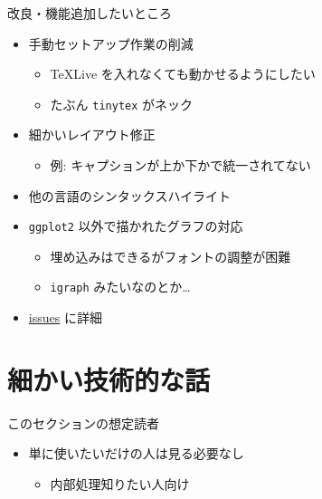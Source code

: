 \documentclass[
  12pt,
  ignorenonframetext,
]{beamer}
\providecommand{\tightlist}{%
  \setlength{\itemsep}{0pt}\setlength{\parskip}{0pt}}
\begin{document}
\begin{frame}[fragile]{改良・機能追加したいところ}
\protect\hypertarget{ux6539ux826fux6a5fux80fdux8ffdux52a0ux3057ux305fux3044ux3068ux3053ux308d}{}

\begin{itemize}
\tightlist
\item
  手動セットアップ作業の削減

  \begin{itemize}
  \tightlist
  \item
    TeXLive を入れなくても動かせるようにしたい
  \item
    たぶん \texttt{tinytex} がネック
  \end{itemize}
\item
  細かいレイアウト修正

  \begin{itemize}
  \tightlist
  \item
    例: キャプションが上か下かで統一されてない
  \end{itemize}
\item
  他の言語のシンタックスハイライト
\item
  \texttt{ggplot2} 以外で描かれたグラフの対応

  \begin{itemize}
  \tightlist
  \item
    埋め込みはできるがフォントの調整が困難
  \item
    \texttt{igraph} みたいなのとか\ldots{}
  \end{itemize}
\item
  \href{https://github.com/Gedevan-Aleksizde/my_latex_templates/labels/enhancement}{issues}
  に詳細
\end{itemize}

\end{frame}

\hypertarget{ux7d30ux304bux3044ux6280ux8853ux7684ux306aux8a71}{%
\section{細かい技術的な話}\label{ux7d30ux304bux3044ux6280ux8853ux7684ux306aux8a71}}

\begin{frame}{このセクションの想定読者}
\protect\hypertarget{ux3053ux306eux30bbux30afux30b7ux30e7ux30f3ux306eux60f3ux5b9aux8aadux8005}{}

\begin{itemize}
\tightlist
\item
  単に使いたいだけの人は見る必要なし

  \begin{itemize}
  \tightlist
  \item
    内部処理知りたい人向け
  \end{itemize}
\end{itemize}

\end{frame}
\end{document}
